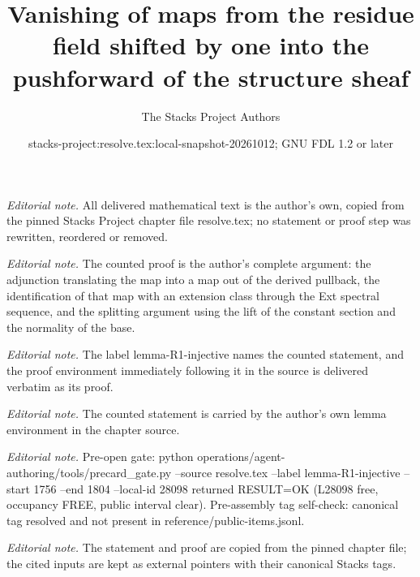 \documentclass[10pt,a4paper]{amsart}
\title{Vanishing of maps from the residue field shifted by one into the pushforward of the structure sheaf}
\author{The Stacks Project Authors}
\date{stacks-project:resolve.tex:local-snapshot-20261012; GNU FDL 1.2 or later}
\theoremstyle{plain}
\theoremstyle{definition}
\theoremstyle{remark}
\numberwithin{equation}{subsection}
\begin{document}
\maketitle
\noindent\textit{Editorial note.} All delivered mathematical text is the author's own, copied from the pinned Stacks Project chapter file resolve.tex; no statement or proof step was rewritten, reordered or removed.\par\medskip
\noindent\textit{Editorial note.} The counted proof is the author's complete argument: the adjunction translating the map into a map out of the derived pullback, the identification of that map with an extension class through the Ext spectral sequence, and the splitting argument using the lift of the constant section and the normality of the base.\par\medskip
\noindent\textit{Editorial note.} The label lemma-R1-injective names the counted statement, and the proof environment immediately following it in the source is delivered verbatim as its proof.\par\medskip
\noindent\textit{Editorial note.} The counted statement is carried by the author's own lemma environment in the chapter source.\par\medskip
\noindent\textit{Editorial note.} Pre-open gate: python operations/agent-authoring/tools/precard\_gate.py --source resolve.tex --label lemma-R1-injective --start 1756 --end 1804 --local-id 28098 returned RESULT=OK (L28098 free, occupancy FREE, public interval clear). Pre-assembly tag self-check: canonical tag resolved and not present in reference/public-items.jsonl.\par\medskip
\noindent\textit{Editorial note.} The statement and proof are copied from the pinned chapter file; the cited inputs are kept as external pointers with their canonical Stacks tags.\par\medskip
\end{document}

